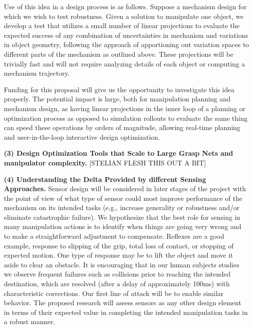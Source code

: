 Use of this idea in a design process is as follows.   Suppose a mechanism design for which we wish to test robustness.    Given a  solution to manipulate one object, we develop a test that utilizes a small number of linear projections to evaluate the expected success of any combination of uncertainties in mechanism and variations in object geometry, following the approach of apportioning out variation spaces to different parts of the mechanism as outlined above.   These projections will be trivially fast and will not require analyzing details of each object or computing a mechanism trajectory.

Funding for this proposal will give us the opportunity to investigate this idea properly.   The potential impact is large, both for manipulation planning and mechanism design, as having linear projections in the inner loop of a planning or optimization process as opposed to simulation rollouts to evaluate the same thing can speed these operations by orders of magnitude, allowing real-time planning and user-in-the-loop interactive design optimization.

\smallskip\noindent
{\bf (3) Design Optimization Tools that Scale to Large Grasp Nets and manipulator complexity.}   [STELIAN FLESH THIS OUT A BIT]

 \smallskip\noindent
{\bf (4) Understanding the Delta Provided by different Sensing Approaches.}   Sensor design will be considered in later stages of the project with the point of view of what type of sensor could most improve performance of the mechanism on its intended tasks (e.g., increase generality or robustness and/or eliminate catastrophic failure).   We hypothesize that the best role for sensing in many manipulation actions is to identify when things are going very wrong and to make a straightforward adjustment to compensate.   Reflexes are a good example, response to slipping of the grip, total loss of contact, or stopping of expected motion.   One type of response may be to  lift the object and move it aside to clear an obstacle.     It is encouraging that in our human subjects studies we observe frequent failures such as collisions prior to reaching the intended destination, which are resolved (after a delay of approximately 100ms) with characteristic corrections.    Our first line of attack will be to enable similar behavior.  The proposed research  will assess sensors as any other design element in terms of their expected value in completing the intended manipulation tasks in a robust manner.

     

